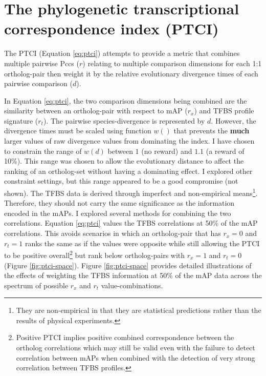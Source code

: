 \section{The phylogenetic transcriptional correspondence index (PTCI)} \label{sec:ptci}

The \gls{PTCI} (Equation \ref{eq:ptci}) attempts to provide a metric that combines multiple pairwise \glspl{Pcc} ($r$) relating to multiple comparison dimensions for each 1:1 ortholog-pair then weight it by the relative evolutionary divergence times of each pairwise comparison ($d$).
%

%
In Equation \ref{eq:ptci}, the two comparison dimensions being combined are the similarity between an ortholog-pair with respect to \gls{mAP} ($r_{x}$) and \gls{TFBS} profile signature ($r_{t}$).
The pairwise species-divergence is represented by $d$.
However, the divergence times must be scaled using function $w()$ that prevents the \textbf{much} larger values of raw divergence values from dominating the index.
I have chosen to constrain the range of $w(d)$ between $1$ (no reward) and $1.1$ (a reward of 10\%).
This range was chosen to allow the evolutionary distance to affect the ranking of an ortholog-set without having a dominating effect.
I explored other constraint settings, but this range appeared to be a good compromise (not shown).%
%
%
%
The \gls{TFBS} data is derived through imperfect and non-empirical means\footnote{They are non-empirical in that they are statistical predictions rather than the results of physical experiments.}.
Therefore, they should not carry the same significance as the information encoded in the \glspl{mAP}.
I explored several methods for combining the two correlations.
Equation \ref{eq:ptci} values the \gls{TFBS} correlations at 50\% of the \gls{mAP} correlations.
This avoids scenarios in which an ortholog-pair that has $r_{x} = 0$ and $r_{t}=1$ ranks the same as if the values were opposite while still allowing the \gls{PTCI} to be positive overall\footnote{Positive \gls{PTCI} implies positive combined correspondence between the ortholog correlations which may still be valid even with the failure to detect correlation between \glspl{mAP} when combined with the detection of very strong correlation between \gls{TFBS} profiles.} but rank below ortholog-pairs with $r_{x} = 1$ and $r_{t}=0$ (Figure \ref{fig:ptci-space}).
Figure \ref{fig:ptci-space} provides detailed illustrations of the effects of weighting the \gls{TFBS} information at 50\% of the \gls{mAP} data across the spectrum of possible $r_{x}$ and $r_{t}$ value-combinations.

